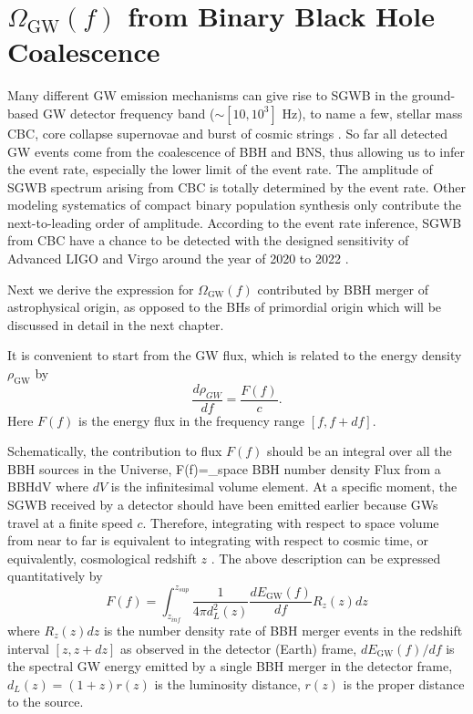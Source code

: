 \section{$\Omega_\text{GW}(f)$ from Binary Black Hole Coalescence}

Many different \ac{GW} emission mechanisms can give rise to \ac{SGWB} in the ground-based \ac{GW} detector frequency band ($\sim[10,10^3]$ Hz), to name a few, stellar mass \ac{CBC}, core collapse supernovae and burst of cosmic strings \cite{Christensen:sgwbreview}.
So far all detected \ac{GW} events come from the coalescence of \ac{BBH} and \ac{BNS}, thus allowing us to infer the event rate, especially the lower limit of the event rate.
The amplitude of \ac{SGWB} spectrum arising from \ac{CBC} is totally determined by the event rate. 
Other modeling systematics of compact binary population synthesis only contribute the next-to-leading order of amplitude.
According to the event rate inference, \ac{SGWB} from \ac{CBC} have a chance to be detected with the designed sensitivity of Advanced LIGO and Virgo around the year of 2020 to 2022 \cite{TheLIGOScientific:2016wyq,TheLIGOScientific:2016dpb,Abbott:2017xzg,LIGO-sgwb-o2-iso}.

Next we derive the expression for $\Omega_\text{GW}(f)$ contributed by \ac{BBH} merger of astrophysical origin, as opposed to the \acp{BH} of primordial origin which will be discussed in detail in the next chapter.

It is convenient to start from the \ac{GW} flux, which is related to the energy density $\rho_\text{GW}$ by 
\begin{equation}\label{eq:drhodnu}
\frac{d\rho_{GW}}{df}=\frac{F(f)}{c}.
\end{equation}
Here $F(f)$ is the energy flux in the frequency range $[f,f+df]$.

Schematically, the contribution to flux $F(f)$ should be an integral over all the \ac{BBH} sources in the Universe,
\be
F(f)=\int_{\textrm{space}} \textrm{BBH number density} \times \textrm{Flux from a BBH}\times dV
\ee
where $dV$ is the infinitesimal volume element.
At a specific moment, the \ac{SGWB} received by a detector should have been emitted earlier because \acp{GW} travel at a finite speed $c$.
Therefore, integrating with respect to space volume from near to far is equivalent to integrating with respect to cosmic time, or equivalently, cosmological redshift $z$ \cite{Rosado:2011kv}.
The above description can be expressed quantitatively by
\begin{equation}\label{eq:flux}
F(f)=\int_{z_{inf}}^{z_{sup}} \frac{1}{4\pi d_L^2(z)}\frac{dE_\text{GW}(f)}{df} R_z(z)dz
\end{equation}
where $R_z(z)dz$ is the number density rate of \ac{BBH} merger events in the redshift interval $[z,z+dz]$ as observed in the detector (Earth) frame, $dE_\text{GW}(f)/{df}$ is the spectral \ac{GW} energy emitted by a single \ac{BBH} merger in the detector frame, $d_L(z) = (1+z) r(z)$ is the luminosity distance, $r(z)$ is the proper distance to the source.

